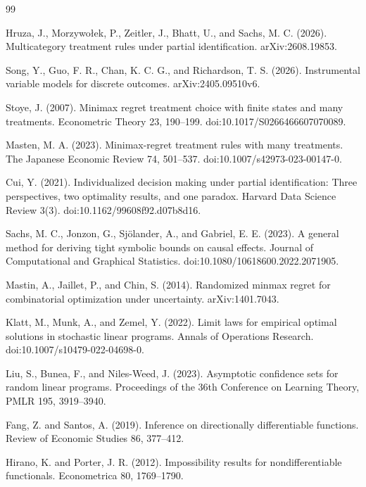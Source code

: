 \documentclass{article}
\begin{document}
\begin{thebibliography}{99}

   Hruza, J., Morzywołek, P., Zeitler, J., Bhatt, U., and Sachs, M. C. (2026). Multicategory treatment rules under partial identification. arXiv:2608.19853.

   Song, Y., Guo, F. R., Chan, K. C. G., and Richardson, T. S. (2026). Instrumental variable models for discrete outcomes. arXiv:2405.09510v6.

   Stoye, J. (2007). Minimax regret treatment choice with finite states and many treatments. Econometric Theory 23, 190--199. doi:10.1017/S0266466607070089.

   Masten, M. A. (2023). Minimax-regret treatment rules with many treatments. The Japanese Economic Review 74, 501--537. doi:10.1007/s42973-023-00147-0.

   Cui, Y. (2021). Individualized decision making under partial identification: Three perspectives, two optimality results, and one paradox. Harvard Data Science Review 3(3). doi:10.1162/99608f92.d07b8d16.

   Sachs, M. C., Jonzon, G., Sjölander, A., and Gabriel, E. E. (2023). A general method for deriving tight symbolic bounds on causal effects. Journal of Computational and Graphical Statistics. doi:10.1080/10618600.2022.2071905.

   Mastin, A., Jaillet, P., and Chin, S. (2014). Randomized minmax regret for combinatorial optimization under uncertainty. arXiv:1401.7043.

   Klatt, M., Munk, A., and Zemel, Y. (2022). Limit laws for empirical optimal solutions in stochastic linear programs. Annals of Operations Research. doi:10.1007/s10479-022-04698-0.

   Liu, S., Bunea, F., and Niles-Weed, J. (2023). Asymptotic confidence sets for random linear programs. Proceedings of the 36th Conference on Learning Theory, PMLR 195, 3919--3940.

   Fang, Z. and Santos, A. (2019). Inference on directionally differentiable functions. Review of Economic Studies 86, 377--412.

   Hirano, K. and Porter, J. R. (2012). Impossibility results for nondifferentiable functionals. Econometrica 80, 1769--1790.


\end{thebibliography}
\end{document}
